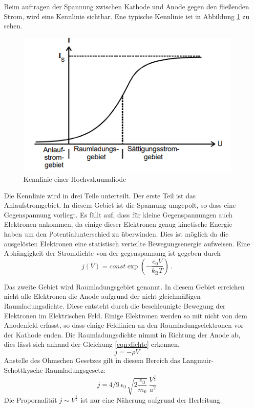 Beim auftragen der Spannung zwischen Kathode und Anode gegen den fließenden Strom, wird eine Kennlinie sichtbar.
Ene typische Kennlinie ist in Abbildung \ref{fig:kennlinie} zu sehen.
\begin{figure}
    \centering
    \caption{Kennlinie einer Hochvakuumdiode \cite{v504}}
    \label{fig:kennlinie}
    \includegraphics[width = 0.5 \textwidth]{pics/kennlinie.png}
\end{figure}
Die Kennlinie wird in drei Teile unterteilt. 
Der erste Teil ist das Anlaufstromgebiet. In diesem Gebiet ist die Spannung umgepolt, so dass eine Gegenspannung vorliegt.
Es fällt auf, dass für kleine Gegenspannungen auch Elektronen ankommen, da einige dieser Elektronen genug kinetische Energie haben um den Potentialunterschied zu überwinden.
Dies ist möglich da die ausgelösten Elektronen eine statistisch verteilte Bewegungsenergie aufweisen. Eine Abhängigkeit der Stromdichte von der gegenspannung ist gegeben durch
\begin{equation}
    j(V)=const \exp\left(-\frac{e_0 V}{k_\text{B} T}\right) \, .
    \label{eqn:anlauf}
\end{equation}

Das zweite Gebiet wird Raumladungsgebiet genannt. In diesem Gebiet erreichen nicht alle Elektronen die Anode aufgrund der nicht gleichmäßigen Raumladungsdichte.
Diese entsteht durch die beschleunigte Bewegung der Elektronen im Elektrischen Feld. Einige Elektronen werden so mit nicht von dem Anodenfeld erfasst, so dass einige Feldlinien an den Raumladungselektronen vor der Kathode enden.
Die Raumladungsdichte nimmt in Richtung der Anode ab, dies lässt sich anhand der Gleichung \eqref{eqn:dichte} erkennen.
\begin{equation}
    j=- \rho V
    \label{eqn:dichte}
\end{equation}
Anstelle des Ohmschen Gesetzes gilt in diesem Bereich das Langmuir-Schottkysche Raumladungsgesetz:
\begin{equation}
    j=4/9 \, \epsilon_0\, \sqrt{2 \frac{e_0}{m_0}} \, \frac{V^{\frac{3}{2}}}{a^2}
    \label{eqn:drei halbe}
\end{equation}
Die Propornalität $j \sim V^{\frac{3}{2}}$ ist nur eine Näherung aufgrund der Herleitung.

